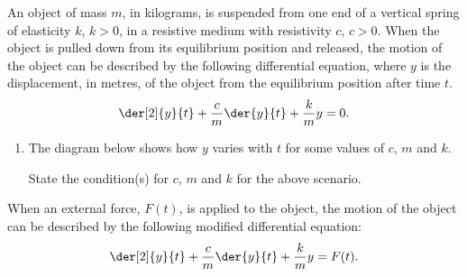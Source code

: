 \begin{problem}
    An object of mass $m$, in kilograms, is suspended from one end of a vertical spring of elasticity $k$, $k > 0$, in a resistive medium with resistivity $c$, $c > 0$. When the object is pulled down from its equilibrium position and released, the motion of the object can be described by the following differential equation, where $y$ is the displacement, in metres, of the object from the equilibrium position after time $t$. \[\der[2]{y}{t} + \frac{c}{m} \der{y}{t} + \frac{k}{m} y = 0.\]

    \begin{enumerate}
        \item The diagram below shows how $y$ varies with $t$ for some values of $c$, $m$ and $k$.
        \begin{figure}[H]
        \centering
        \end{figure}
        State the condition(s) for $c$, $m$ and $k$ for the above scenario.
    \end{enumerate}

    When an external force, $F(t)$, is applied to the object, the motion of the object can be described by the following modified differential equation: \[\der[2]{y}{t} + \frac{c}{m} \der{y}{t} + \frac{k}{m} y = F(t).\]


\end{problem}
